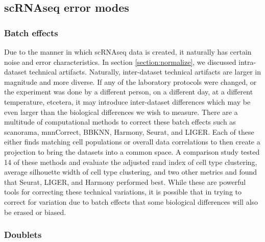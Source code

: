\subsection{scRNAseq error modes}



\subsubsection{Batch effects}

\par{
Due to the manner in which scRNAseq data is created, it naturally has certain noise and error characteristics. In section \ref{section:normalize}, we discussed intra-dataset technical artifacts. Naturally, inter-dataset technical artifacts are larger in magnitude and more diverse. If any of the laboratory protocols were changed, or the experiment was done by a different person, on a different day, at a different temperature, etcetera, it may introduce inter-dataset differences which may be even larger than the biological differences we wish to measure. There are a multitude of computational methods to correct these batch effects such as scanorama\cite{scanorama}, mnnCorrect\cite{batch1}, BBKNN\cite{BBKNN}, Harmony\cite{harmony}, Seurat\cite{suerat3}, and LIGER\cite{LIGER}. Each of these either finds matching cell populations or overall data correlations to then create a projection to bring the datasets into a common space. A comparison study tested 14 of these methods and evaluate the adjusted rand index of cell type clustering, average silhouette width of cell type clustering, and two other metrics and found that Seurat, LIGER, and Harmony performed best. While these are powerful tools for correcting these technical variations, it is possible that in trying to correct for variation due to batch effects that some biological differences will also be erased or biased.
}

\subsubsection{Doublets}

